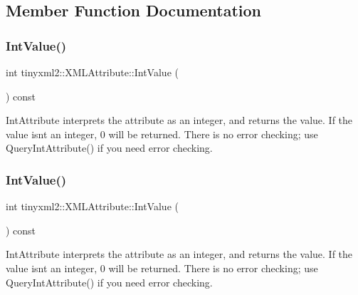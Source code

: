 \subsection{Member Function Documentation}
\mbox{\label{classtinyxml2_1_1XMLAttribute_adfa2433f0fdafd5c3880936de9affa80}} 
\subsubsection{\texorpdfstring{Int\+Value()}{IntValue()}\hspace{0.1cm}{\footnotesize\ttfamily [1/2]}}
{\footnotesize\ttfamily int tinyxml2\+::\+X\+M\+L\+Attribute\+::\+Int\+Value (\begin{DoxyParamCaption}{ }\end{DoxyParamCaption}) const\hspace{0.3cm}{\ttfamily [inline]}}

Int\+Attribute interprets the attribute as an integer, and returns the value. If the value isn\textquotesingle{}t an integer, 0 will be returned. There is no error checking; use Query\+Int\+Attribute() if you need error checking. \mbox{\label{classtinyxml2_1_1XMLAttribute_adfa2433f0fdafd5c3880936de9affa80}} 
\subsubsection{\texorpdfstring{Int\+Value()}{IntValue()}\hspace{0.1cm}{\footnotesize\ttfamily [2/2]}}
{\footnotesize\ttfamily int tinyxml2\+::\+X\+M\+L\+Attribute\+::\+Int\+Value (\begin{DoxyParamCaption}{ }\end{DoxyParamCaption}) const\hspace{0.3cm}{\ttfamily [inline]}}

Int\+Attribute interprets the attribute as an integer, and returns the value. If the value isn\textquotesingle{}t an integer, 0 will be returned. There is no error checking; use Query\+Int\+Attribute() if you need error checking. \mbox{\label{classtinyxml2_1_1XMLAttribute_a6d5176260db00ea301c01af8457cd993}} 
